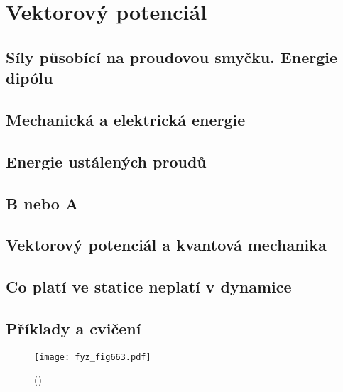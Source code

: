 {
\chapter{Vektorový potenciál}\label{fyz:IIchaXV}
\minitoc
  \section{Síly působící na proudovou smyčku. Energie dipólu}\label{fyz:IIchaXVsecI}
  \section{Mechanická a elektrická energie}\label{fyz:IIchaXVsecII}
  \section{Energie ustálených proudů}\label{fyz:IIchaXVsecIII}
  \section{B nebo A}\label{fyz:IIchaXVsecIV}
  \section{Vektorový potenciál a kvantová mechanika}\label{fyz:IIchaXVsecV}
  \section{Co platí ve statice neplatí v dynamice}\label{fyz:IIchaXVsecVI}
  \section{Příklady a cvičení}\label{fyz:IIchaXVsecVII}

    \begin{figure}[ht!] %
      \centering
      \texttt{[image: fyz\_fig663.pdf]}
      \caption{
               (\cite[s.~707]{Feynman02})}
      \label{fyz_fig663}
    \end{figure}

}
